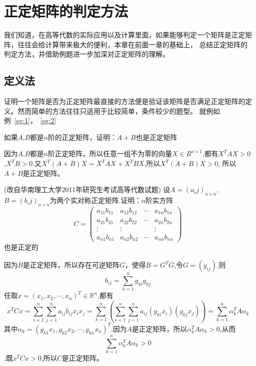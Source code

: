 
\chapter{正定矩阵的判定方法}\label{sec:ssss}
我们知道，在高等代数的实际应用以及计算里面，如果能够判定一个矩阵是正定矩阵，往往会给计算带来极大的便利，本章在前面一章的基础上，
总结正定矩阵的判定方法，并借助例题进一步加深对正定矩阵的理解。
\section{定义法}\label{2_1}
证明一个矩阵是否为正定矩阵最直接的方法便是验证该矩阵是否满足正定矩阵的定义。然而简单的方法往往只适用于比较简单，条件较少的题型。
就例如例~\eqref{eg:1}，~\eqref{eg:2}
\begin{example}\label{eg:1}
  如果$A$,$B$都是$n$阶的正定矩阵，证明：$A+B$也是正定矩阵
\end{example}
\begin{solution}
  因为$A$,$B$都是$n$阶正定矩阵，所以任意一组不为零的向量$X \in R^{n \times 1}$,都有$X^TAX>0$,$X^TB>0$.又$X^T(A+B)X=X^TAX+X^TBX$,所以$X^T(A+B)X>0$,
  所以$A+B$是正定矩阵。
\end{solution}
\begin{example}(改自华南理工大学2011年研究生考试高等代数试题)\label{eg:2}
  设$A=(a_ij)_{n \times n}$,$B=(b_ij)_{n \times n}$为两个实对称正定矩阵.证明：$n$阶实方阵
  \[C=
\begin{pmatrix}
  a_{11}b_{11} & a_{12}b_{12} & \cdots & a_{1n}b_{1n}\\
  a_{21}b_{21} & a_{22}b_{22} & \cdots & a_{2n}b_{2n}\\
  \vdots & \vdots &            & \vdots\\
  a_{n1}b_{n1} & a_{n2}b_{n2} & \cdots & a_{nn}b_{nn}
\end{pmatrix}  
  \]也是正定的
\end{example}
\begin{solution}
   因为$B$是正定矩阵，所以存在可逆矩阵$G$，使得$B=G^TG$,令$G=(g_{ij})$,则$$b_{ij}=\sum_{k=1}^{n} g_{ki}g_{kj}$$
   任取$x=(x_1,x_2,\cdots,x_n)^T \in \mathbb{R}^n$,都有$$x^TCx=\sum_{i=1}^{n} \sum_{j=1}^{n} a_{ij}b_{ij}x_ix_j=
   \sum_{k=1}^{n}(\sum_{i=1}^n \sum_{j=1}^{n} a_{ij}(g_{ki}x_i)(g_{kj}x_j))=\sum_{k=1}^{n}\alpha_k^{T}A\alpha_k$$
   其中$\alpha_k=(g_{k1}x_1,g_{k2}x_2,\cdots,g_{kn}x_n)^T$.因为$A$是正定矩阵，所以$\alpha_k^{T}A\alpha_k>0$,从而
   $$\sum_{k=1}^{n}\alpha_k^{T}A\alpha_k>0$$,既$x^TCx>0$,所以$C$是正定矩阵。
\end{solution}
